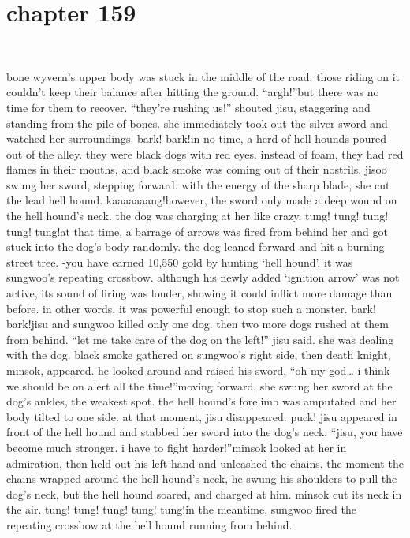 \section{chapter 159}

                             




bone wyvern’s upper body was stuck in the middle of the road.
 those riding on it couldn’t keep their balance after hitting the ground.
“argh!”but there was no time for them to recover.
“they’re rushing us!” shouted jisu, staggering and standing from the pile of bones.
 she immediately took out the silver sword and watched her surroundings.
bark! bark!in no time, a herd of hell hounds poured out of the alley.
 they were black dogs with red eyes.
 instead of foam, they had red flames in their mouths, and black smoke was coming out of their nostrils.
jisoo swung her sword, stepping forward.
 with the energy of the sharp blade, she cut the lead hell hound.
kaaaaaaang!however, the sword only made a deep wound on the hell hound’s neck.
 the dog was charging at her like crazy.
tung! tung! tung! tung! tung!at that time, a barrage of arrows was fired from behind her and got stuck into the dog’s body randomly.
 the dog leaned forward and hit a burning street tree.
-you have earned 10,550 gold by hunting ‘hell hound’.
it was sungwoo’s repeating crossbow.
 although his newly added ‘ignition arrow’ was not active, its sound of firing was louder, showing it could inflict more damage than before.
 in other words, it was powerful enough to stop such a monster.
bark! bark!jisu and sungwoo killed only one dog.
 then two more dogs rushed at them from behind.
“let me take care of the dog on the left!” jisu said.
she was dealing with the dog.
 black smoke gathered on sungwoo’s right side, then death knight, minsok, appeared.
 he looked around and raised his sword.
“oh my god… i think we should be on alert all the time!”moving forward, she swung her sword at the dog’s ankles, the weakest spot.
 the hell hound’s forelimb was amputated and her body tilted to one side.
 at that moment, jisu disappeared.
puck!
jisu appeared in front of the hell hound and stabbed her sword into the dog’s neck.
“jisu, you have become much stronger.
 i have to fight harder!”minsok looked at her in admiration, then held out his left hand and unleashed the chains.
the moment the chains wrapped around the hell hound’s neck, he swung his shoulders to pull the dog’s neck, but the hell hound soared, and charged at him.
minsok cut its neck in the air.
tung! tung! tung! tung! tung!in the meantime, sungwoo fired the repeating crossbow at the hell hound running from behind.
